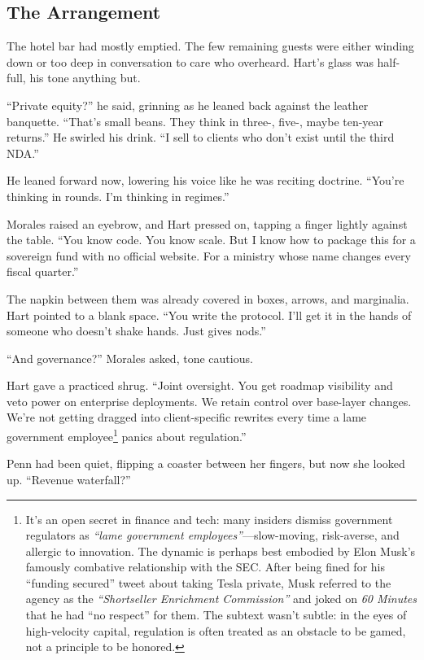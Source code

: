 \medskip

\subsection{The Arrangement}

The hotel bar had mostly emptied. The few remaining guests were either winding down or too deep in conversation to 
care who overheard. Hart’s glass was half-full, his tone anything but.

“Private equity?” he said, grinning as he leaned back against the leather banquette. “That’s small beans. They think 
in three-, five-, maybe ten-year returns.” He swirled his drink. “I sell to clients who don’t exist until the 
third NDA.”

He leaned forward now, lowering his voice like he was reciting doctrine. “You’re thinking in rounds. 
I’m thinking in regimes.”

Morales raised an eyebrow, and Hart pressed on, tapping a finger lightly against the table. “You know code. 
You know scale. But I know how to package this for a sovereign fund with no official website. For a ministry whose name 
changes every fiscal quarter.”

The napkin between them was already covered in boxes, arrows, and marginalia. Hart pointed to a blank space. “You 
write the protocol. I’ll get it in the hands of someone who doesn’t shake hands. Just gives nods.”

“And governance?” Morales asked, tone cautious.

Hart gave a practiced shrug. “Joint oversight. You get roadmap visibility and veto power on enterprise deployments. 
We retain control over base-layer changes. We’re not getting dragged into client-specific rewrites every time a 
lame government employee\footnote{
It’s an open secret in finance and tech: many insiders dismiss government regulators as \emph{``lame government 
employees''}—slow-moving, risk-averse, and allergic to innovation. The dynamic is perhaps best embodied by Elon Musk’s 
famously combative relationship with the SEC. After being fined for his “funding secured” tweet about taking Tesla 
private, Musk referred to the agency as the \emph{“Shortseller Enrichment Commission”} and joked on \emph{60 
Minutes} that he had “no respect” for them. The subtext wasn’t subtle: in the eyes of high-velocity capital, 
regulation is often treated as an obstacle to be gamed, not a principle to be honored.
}
panics about regulation.”

Penn had been quiet, flipping a coaster between her fingers, but now she looked up. “Revenue waterfall?”

